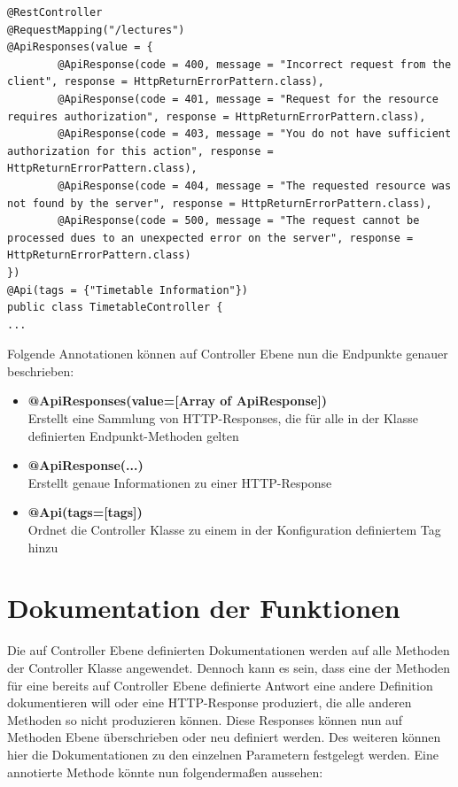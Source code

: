\begin{lstlisting}[caption={Swagger Konfiguration auf Controller Ebene am Beispiel des Timetable Controllers}]
@RestController
@RequestMapping("/lectures")
@ApiResponses(value = {
        @ApiResponse(code = 400, message = "Incorrect request from the client", response = HttpReturnErrorPattern.class),
        @ApiResponse(code = 401, message = "Request for the resource requires authorization", response = HttpReturnErrorPattern.class),
        @ApiResponse(code = 403, message = "You do not have sufficient authorization for this action", response = HttpReturnErrorPattern.class),
        @ApiResponse(code = 404, message = "The requested resource was not found by the server", response = HttpReturnErrorPattern.class),
        @ApiResponse(code = 500, message = "The request cannot be processed dues to an unexpected error on the server", response = HttpReturnErrorPattern.class)
})
@Api(tags = {"Timetable Information"})
public class TimetableController {
...
\end{lstlisting}

Folgende Annotationen können auf Controller Ebene nun die Endpunkte genauer beschrieben:

\begin{itemize}
\item \textbf{@ApiResponses(value=[Array of ApiResponse])}\\
Erstellt eine Sammlung von \ac{HTTP}-Responses, die für alle in der Klasse definierten Endpunkt-Methoden gelten
\item \textbf{@ApiResponse(...)}\\
Erstellt genaue Informationen zu einer \ac{HTTP}-Response
\item \textbf{@Api(tags=[tags])}\\
Ordnet die Controller Klasse zu einem in der Konfiguration definiertem Tag hinzu
\end{itemize}

\section{Dokumentation der Funktionen}

Die auf Controller Ebene definierten Dokumentationen werden auf alle Methoden der Controller Klasse angewendet. Dennoch kann es sein, dass eine der Methoden für eine bereits auf Controller Ebene definierte Antwort eine andere Definition dokumentieren will oder eine \ac{HTTP}-Response produziert, die alle anderen Methoden so nicht produzieren können. Diese Responses können nun auf Methoden Ebene überschrieben oder neu definiert werden. Des weiteren können hier die Dokumentationen zu den einzelnen Parametern festgelegt werden. Eine annotierte Methode könnte nun folgendermaßen aussehen:

